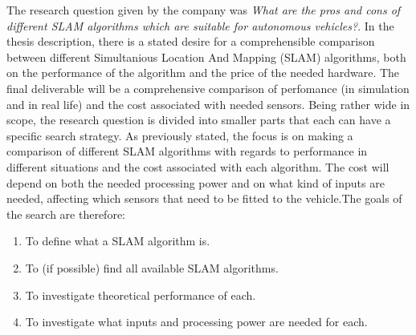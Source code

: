 The research question given by the company was \textit{What are the pros and
cons of different SLAM algorithms which are suitable for autonomous vehicles?}.
In the thesis description, there is a stated desire for a comprehensible
comparison between different Simultanious Location And Mapping (SLAM)
algorithms, both on the performance of the algorithm and the price of the
needed hardware. The final deliverable will be a comprehensive comparison of
perfomance (in simulation and in real life) and the cost associated with needed
sensors.  Being rather wide in scope, the research question is divided into
smaller parts that each can have a specific search strategy. As previously
stated, the focus is on making a comparison of different SLAM algorithms with
regards to performance in different situations and the cost associated with
each algorithm.  The cost will depend on both the needed processing power and
on what kind of inputs are needed, affecting which sensors that need to be
fitted to the vehicle.The goals of the search are therefore:
\begin{enumerate}
    \item To define what a SLAM algorithm is.
    \item To (if possible) find all available SLAM algorithms.
    \item To investigate theoretical performance of each.
    \item To investigate what inputs and processing power are needed for each.
\end{enumerate}
